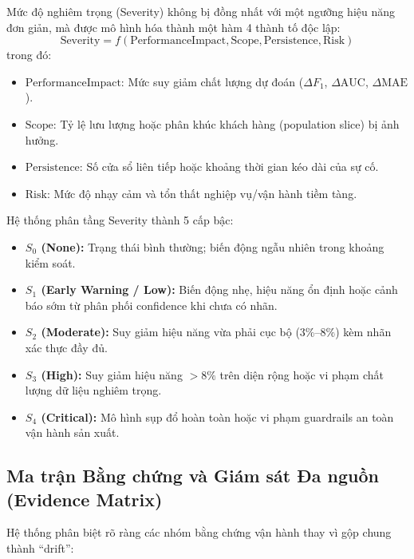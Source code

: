 Mức độ nghiêm trọng (Severity) không bị đồng nhất với một ngưỡng hiệu năng đơn giản, mà được mô hình hóa thành một hàm 4 thành tố độc lập:
$$\text{Severity} = f(\text{PerformanceImpact}, \text{Scope}, \text{Persistence}, \text{Risk})$$
trong đó:
\begin{itemize}
  \item $\text{PerformanceImpact}$: Mức suy giảm chất lượng dự đoán ($\Delta F_1$, $\Delta \text{AUC}$, $\Delta \text{MAE}$).
  \item $\text{Scope}$: Tỷ lệ lưu lượng hoặc phân khúc khách hàng (population slice) bị ảnh hưởng.
  \item $\text{Persistence}$: Số cửa sổ liên tiếp hoặc khoảng thời gian kéo dài của sự cố.
  \item $\text{Risk}$: Mức độ nhạy cảm và tổn thất nghiệp vụ/vận hành tiềm tàng.
\end{itemize}

Hệ thống phân tầng Severity thành 5 cấp bậc:
\begin{itemize}
  \item \textbf{$S_0$ (None):} Trạng thái bình thường; biến động ngẫu nhiên trong khoảng kiểm soát.
  \item \textbf{$S_1$ (Early Warning / Low):} Biến động nhẹ, hiệu năng ổn định hoặc cảnh báo sớm từ phân phối confidence khi chưa có nhãn.
  \item \textbf{$S_2$ (Moderate):} Suy giảm hiệu năng vừa phải cục bộ ($3\%\text{--}8\%$) kèm nhãn xác thực đầy đủ.
  \item \textbf{$S_3$ (High):} Suy giảm hiệu năng $> 8\%$ trên diện rộng hoặc vi phạm chất lượng dữ liệu nghiêm trọng.
  \item \textbf{$S_4$ (Critical):} Mô hình sụp đổ hoàn toàn hoặc vi phạm guardrails an toàn vận hành sản xuất.
\end{itemize}

\subsection{Ma trận Bằng chứng và Giám sát Đa nguồn (Evidence Matrix)}

Hệ thống phân biệt rõ ràng các nhóm bằng chứng vận hành thay vì gộp chung thành ``drift'':

